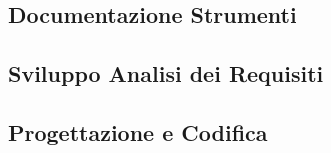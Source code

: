 \subsection{Documentazione Strumenti}

\subsection{Sviluppo Analisi dei Requisiti}

\subsection{Progettazione e Codifica}
